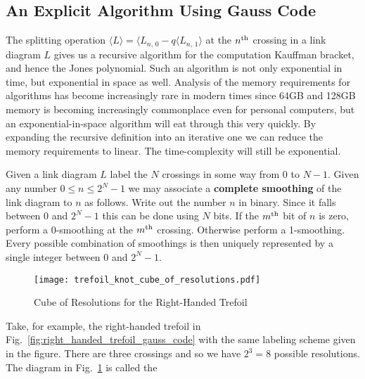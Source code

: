     \subsection{An Explicit Algorithm Using Gauss Code}
        The splitting operation
        $\langle{L}\rangle=\langle{L_{n,\,0}}-q\langle{L_{n,\,1}}\rangle$ at
        the $n^{\small\textrm{th}}$ crossing in a link diagram $L$ gives us a
        recursive algorithm for the computation Kauffman bracket, and hence
        the Jones polynomial. Such an algorithm is not only exponential in
        time, but exponential in space as well. Analysis of the memory
        requirements for algorithms has become increasingly rare in modern
        times since 64GB and 128GB memory is becoming increasingly
        commonplace even for personal computers, but an exponential-in-space
        algorithm will eat through this very quickly. By expanding the
        recursive definition into an iterative one we can reduce the memory
        requirements to linear. The time-complexity will still be exponential.
        \par\hfill\par
        Given a link diagram $L$ label the $N$ crossings in some way from $0$
        to $N-1$. Given any number $0\leq{n}\leq{2}^{N}-1$ we may associate a
        \textbf{complete smoothing} of the link diagram to $n$ as follows.
        Write out the number $n$ in binary. Since it falls between $0$ and
        $2^{N}-1$ this can be done using $N$ bits. If the
        $m^{\small\textrm{th}}$ bit of $n$ is zero, perform a 0-smoothing at
        the $m^{\small\textrm{th}}$ crossing. Otherwise perform a 1-smoothing.
        Every possible combination of smoothings is then uniquely represented
        by a single integer between $0$ and $2^{N}-1$.
        \par\hfill\par
        \begin{figure}
            \centering
            \texttt{[image: trefoil\_knot\_cube\_of\_resolutions.pdf]}
            \caption{Cube of Resolutions for the Right-Handed Trefoil}
            \label{fig:trefoil_knot_cube_of_resolutions}
        \end{figure}
        Take, for example, the right-handed trefoil in
        Fig.~\ref{fig:right_handed_trefoil_gauss_code} with the same labeling
        scheme given in the figure. There are three crossings and so we have
        $2^{3}=8$ possible resolutions. The diagram
        in Fig.~\ref{fig:trefoil_knot_cube_of_resolutions} is called the
